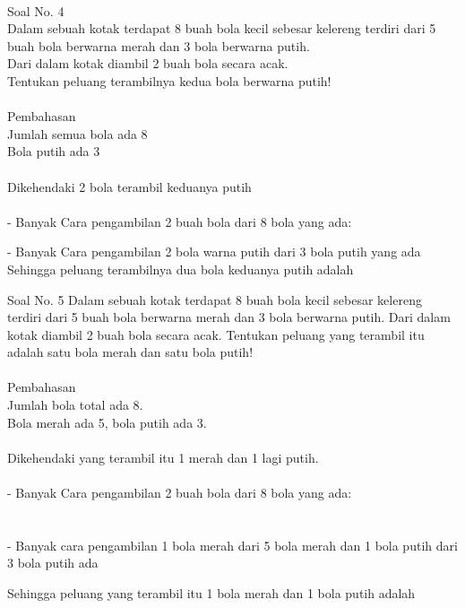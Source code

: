 \documentclass[11pt,fleqn]{book} %
\begin{document}
 \\
Soal No. 4\\
Dalam sebuah kotak terdapat 8 buah bola kecil sebesar kelereng terdiri dari 5 buah bola berwarna merah dan 3 bola berwarna putih.\\
Dari dalam kotak diambil 2 buah bola secara acak.\\
Tentukan peluang terambilnya kedua bola berwarna putih! \\
\\
Pembahasan\\
Jumlah semua bola ada 8\\
Bola putih ada 3\\
\\
Dikehendaki 2 bola terambil keduanya putih \\
\\
- Banyak Cara pengambilan 2 buah bola dari 8 bola yang ada: 

 
- Banyak Cara pengambilan 2 bola warna putih dari 3 bola putih yang ada \\


Sehingga peluang terambilnya dua bola keduanya putih adalah 



Soal No. 5
Dalam sebuah kotak terdapat 8 buah bola kecil sebesar kelereng terdiri dari 5 buah bola berwarna merah dan 3 bola berwarna putih. Dari dalam kotak diambil 2 buah bola secara acak. Tentukan peluang yang terambil itu adalah satu bola merah dan satu bola putih! \\
\\
Pembahasan\\
Jumlah bola total ada 8.\\
Bola merah ada 5, bola putih ada 3.\\
\\
Dikehendaki yang terambil itu 1 merah dan 1 lagi putih.\\
\\
- Banyak Cara pengambilan 2 buah bola dari 8 bola yang ada: 
\\
 \\
\\
- Banyak cara pengambilan 1 bola merah dari 5 bola merah dan 1 bola putih dari 3 bola putih ada 

Sehingga peluang yang terambil itu 1 bola merah dan 1 bola putih adalah 
\end{document}
